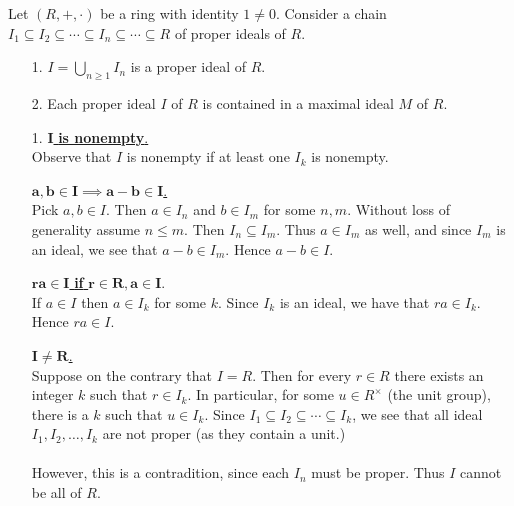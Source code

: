 \documentclass[12pt,letterpaper]{algebra_book}
\theoremstyle{definition}
\begin{document}
    \begin{thm}
        Let $(R, +, \cdot)$ be a ring with identity $1 \ne 0$.
        Consider a chain $I_1 \subseteq I_2 \subseteq \cdots \subseteq
        I_n \subseteq \cdots \subseteq R$ of proper ideals of $R$.
        \begin{itemize}
            \item[1.] $\displaystyle I = \bigcup_{n \ge 1}I_n$ is a proper
            ideal of $R$. 

            \item[2.] Each proper ideal $I$ of $R$ is
            contained in a maximal ideal $M$ of $R$.
        \end{itemize}
    \end{thm}

    \begin{prf}
        \begin{itemize}
            \item[1.]
            \underline{$\bm{I}$ \textbf{is nonempty}.}\\[1.2ex]
            Observe that $I$ is nonempty if at least one $I_k$ is
            nonempty. 
    
            \noindent\underline{$\bm{a, b \in I \implies a -b \in I}$.}\\[1.2ex]
            Pick $a, b \in I$. Then $a \in I_n$ and $b \in I_m$ for some
            $n, m$. Without loss of generality assume $n \le m$. Then $I_n
            \subseteq I_m$. Thus $a \in I_m$ as well, and since $I_m$ is
            an ideal, we see that $a - b \in I_m$. Hence $a - b \in I$. 
    
            \noindent\underline{$\bm{ra \in I}$ \textbf{if} $\bm{r \in R,
            a \in I}$}.\\[1.2ex]
            If $a \in I$ then $a \in I_k$ for some $k$. Since $I_k$ is an
            ideal, we have that $ra \in I_k$. Hence $ra \in I$. 
    
            \noindent\underline{$\bm{I \ne R}$.}\\[1.2ex]
            Suppose on the contrary that $I = R$. Then for every $r \in R$
            there exists an integer $k$ such that $r \in I_k$. In
            particular, for some $u \in R^{\times}$ (the unit group),
            there is a $k$ such that $u \in I_k$. Since $I_1 \subseteq I_2
            \subseteq
            \cdots \subseteq I_k$, we see that all ideal $I_1, I_2,
            \dots, I_k$ are not proper (as they contain a unit.)
            \\
            \\
            However, this is a contradition, since each $I_n$ must be
            proper. Thus $I$ cannot be all of $R$. 
    

\end{itemize}
\end{prf}
\end{document}
